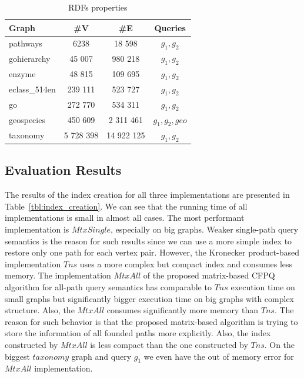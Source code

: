 {\setlength{\tabcolsep}{0.25em}
	\begin{table}
		{
			\caption{RDFs properties}
			\label{tbl:propRDF}
			\small
			\begin{tabular}{|l|c|c|c|}
				\hline
				Graph & \#V & \#E & Queries \\
				\hline
				\hline
				pathways               & 6238                 & 18 598               & $g_1, g_2$ \\
				gohierarchy            & 45 007               & 980 218              & $g_1, g_2$ \\
				enzyme                 & 48 815               & 109 695              & $g_1, g_2$ \\
				eclass\_514en          & 239 111              & 523 727              & $g_1, g_2$ \\
				go                     & 272 770              & 534 311              & $g_1, g_2$ \\
				geospecies             & 450 609              & 2 311 461            & $g_1, g_2, geo$  \\
				taxonomy                   & 5 728 398                 & 14 922 125                 & $g_1, g_2$ \\
				\hline
			\end{tabular}
		}
	\end{table}
}


\subsection{Evaluation Results}
The results of the index creation for all three implementations are presented in Table~\ref{tbl:index_creation}. We can see that the running time of all implementations is
small in almost all cases. The most performant implementation is $MtxSingle$, especially on big graphs. Weaker single-path query semantics is the reason for such results since we can use a more simple index to restore only one path for each vertex pair. However, the Kronecker product-based implementation $Tns$ uses a more complex but compact index and consumes less memory. The implementation $MtxAll$ of the proposed matrix-based CFPQ algorithm for all-path query semantics has comparable to $Tns$ execution time on small graphs but significantly bigger execution time on big graphs with complex structure. Also, the $MtxAll$ 
consumes significantly more memory than $Tns$. The reason for such behavior is that the proposed matrix-based algorithm is trying to store the information of all founded paths more explicitly. Also, the index constructed by $MtxAll$ is less compact than the one constructed by $Tns$. On the biggest $taxonomy$ graph and query $g_1$ we even have the out of memory error for $MtxAll$ implementation.


